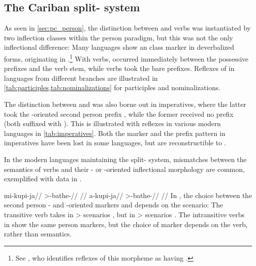 \subsection{The Cariban split- system}
\label{sec:split}
As seen in \cref{sec:pc_person}, the distinction between  and  verbs was instantiated by two inflection classes within the \PC \setone person paradigm, but this was not the only inflectional difference:
%
Many languages show an  class marker in deverbalized forms, originating in \PC {}.\footnote{See \textcite[227]{meira2000split}, who identifies reflexes of this morpheme as having .}
With  verbs,  occurred immediately between the possessive prefixes and the verb stem, while  verbs took the bare prefixes.
Reflexes of  in languages from different branches are illustrated in \cref{tab:participles,tab:nominalizations} for participles and nominalizations.%
%
%
%
%
%

%
The distinction between  and  was also borne out in imperatives, where the latter took the -oriented second person prefix , while the former received no prefix (both suffixed with ).
This is illustrated with reflexes in various modern languages in \cref{tab:imperatives}.
Both the  marker  and the prefix pattern in imperatives have been lost in some languages, but are reconstructible to \PC.


In the modern languages maintaining the split- system, mismatches between the semantics of verbs and their - or -oriented inflectional morphology are common, exemplified with \kalina data in .

 \kalina
{}
\begingl
\gla mi-kupi-ja//
\glb {}>-bathe-//
\glft {} \parencite[][160]{hoff1968carib}//
\endgl
{}
\begingl
\gla a-kupi-ja//
\glb {}>-bathe-//
\glft {} \parencite[][63]{yamada2011evidentiality}//
\endgl
\xe
%
In , the choice between the second person - and -oriented markers  and  depends on the scenario:
The transitive verb   takes  in > scenarios , but  in > scenarios .
The intransitive verbs in  show the same person markers, but the choice of marker depends on the verb, rather than semantics.

